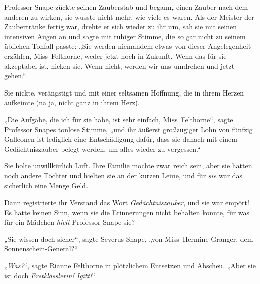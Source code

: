 Professor Snape zückte seinen Zauberstab und begann, einen Zauber nach dem anderen zu wirken, sie wusste nicht mehr, wie viele es waren. Als der Meister der Zaubertränke fertig war, drehte er sich wieder zu ihr um, sah sie mit seinen intensiven Augen an und sagte mit ruhiger Stimme, die so gar nicht zu seinem üblichen Tonfall passte:
„Sie werden niemandem etwas von dieser Angelegenheit erzählen, Miss~Felthorne, weder jetzt noch in Zukunft. Wenn das für sie akzeptabel ist, nicken sie. Wenn nicht, werden wir uns umdrehen und jetzt gehen.“

Sie nickte, verängstigt und mit einer seltsamen Hoffnung, die in ihrem Herzen aufkeimte (na ja, nicht ganz in ihrem Herz).

„Die Aufgabe, die ich für sie habe, ist sehr einfach, Miss~Felthorne“, sagte Professor Snapes tonlose Stimme, „und ihr äußerst großzügiger Lohn von fünfzig Galleonen ist lediglich eine Entschädigung dafür, dass sie danach mit einem Gedächtniszauber belegt werden, um alles wieder zu vergessen.“

Sie holte unwillkürlich Luft. Ihre Familie mochte zwar reich sein, aber sie hatten noch andere Töchter und hielten sie an der kurzen Leine, und für \emph{sie} war das sicherlich eine Menge Geld.

Dann registrierte ihr Verstand das Wort \emph{Gedächtniszauber}, und sie war empört! Es hatte keinen Sinn, wenn sie die Erinnerungen nicht behalten konnte, für was für ein Mädchen \emph{hielt} Professor Snape sie?

„Sie wissen doch sicher“, sagte Severus Snape, „von Miss~Hermine Granger, dem Sonnenschein-General?“

„\emph{Was?}“, sagte Rianne Felthorne in plötzlichem Entsetzen und Abscheu.
„Aber sie ist doch \emph{Erstklässlerin! Igitt!}“

